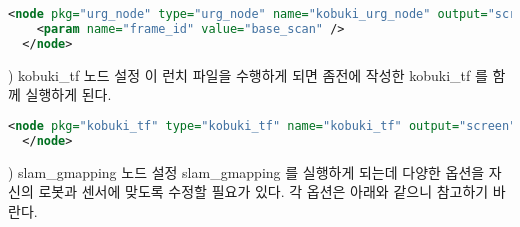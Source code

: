 \vspace{\baselineskip}
\begin{lstlisting}[language=XML]
  <node pkg="urg_node" type="urg_node" name="kobuki_urg_node" output="screen">
    <param name="frame_id" value="base_scan" />
  </node>
\end{lstlisting}

\vspace{\baselineskip}
\noindent
{}) kobuki\_tf 노드 설정
이 런치 파일을 수행하게 되면 좀전에 작성한 kobuki\_tf 를 함께 실행하게 된다.

\vspace{\baselineskip}
\begin{lstlisting}[language=XML]
  <node pkg="kobuki_tf" type="kobuki_tf" name="kobuki_tf" output="screen">
  </node>
\end{lstlisting}

\vspace{\baselineskip}
\noindent
{}) slam\_gmapping 노드 설정
slam\_gmapping 를 실행하게 되는데 다양한 옵션을 자신의 로봇과 센서에 맞도록 수정할 필요가 있다. 각 옵션은 아래와 같으니 참고하기 바란다.

